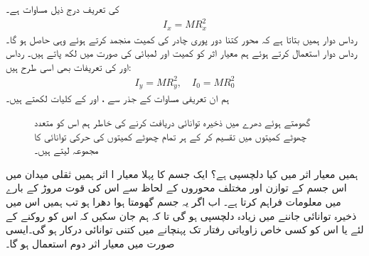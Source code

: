    کی تعریف درج ذیل مساوات  ہے۔
\begin{align*}
I_x=MR_x^2
\end{align*}
رداس دوار ہمیں بتاتا ہے کہ محور   کتنا دور   پوری چادر کی کمیت منجمد کرتے ہوئے  وہی  حاصل ہو گا۔ رداس دوار استعمال کرتے ہوئے ہم معیار اثر کو کمیت اور لمبائی کی صورت میں لکھ پاتے ہیں۔ رداس  اور  کی تعریفات بھی اسی طرح ہیں:
\begin{align*}
I_y=MR_y^2,\quad I_0=MR_0^2
\end{align*}
ہم ان تعریفی مساوات کے جذر سے ،  اور  کے    کلیات لکھتے ہیں۔

\begin{figure}
\centering
{}
\caption{گھومتے ہوئے دھرے میں ذخیرہ توانائی دریافت کرنے کی خاطر ہم اس کو متعدد چھوٹے کمیتوں میں تقسیم کر کے ہر تمام چھوٹے کمیتوں کی حرکی توانائی کا مجموعہ لیتے ہیں۔}
\label{شکل_بالکثرت_دھرے_کی_حرکی_توانائی}
\end{figure}
ہمیں معیار اثر میں کیا  دلچسپی ہے؟ ایک جسم کا  پہلا معیار ا اثر  ہمیں ثقلی میدان میں اس جسم کے  توازن  اور مختلف محوروں کے لحاظ  سے اس کی  قوت مروڑ کے بارے میں معلومات فراہم کرتا ہے۔  اب اگر یہ جسم  گھومتا ہوا دھرا ہو تب ہمیں اس   میں ذخیرہ توانائی جاننے میں زیادہ دلچسپی ہو گی تا کہ ہم جان سکیں کہ اس کو روکنے کے لئے یا اس کو کسی خاص زاویاتی رفتار تک پہنچانے میں کتنی توانائی درکار ہو گی۔ایسی صورت میں معیار اثر دوم  استعمال ہو گا۔

